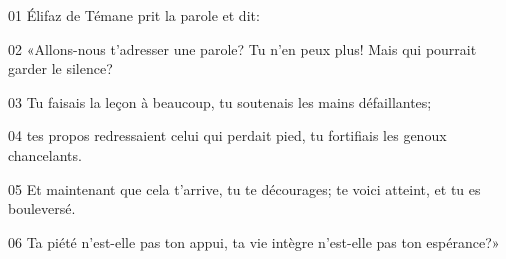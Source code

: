 01 Élifaz de Témane prit la parole et dit:

02 «Allons-nous t’adresser une parole? Tu n’en peux plus! Mais qui pourrait garder le silence?

03 Tu faisais la leçon à beaucoup, tu soutenais les mains défaillantes;

04 tes propos redressaient celui qui perdait pied, tu fortifiais les genoux chancelants.

05 Et maintenant que cela t’arrive, tu te décourages; te voici atteint, et tu es bouleversé.

06 Ta piété n’est-elle pas ton appui, ta vie intègre n’est-elle pas ton espérance?»